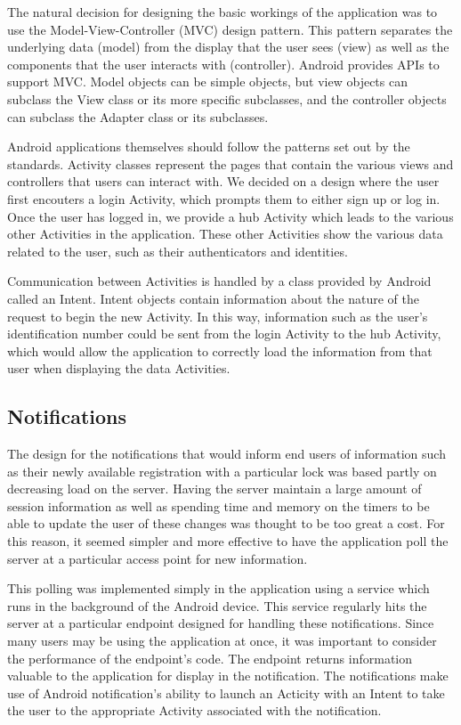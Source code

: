 \documentclass[12pt]{report}
\begin{document}
The natural decision for designing the basic workings of the application was to use the Model-View-Controller (MVC) 
design pattern. This pattern separates the underlying data (model) from the display that the user sees (view) as well as
the components that the user interacts with (controller). Android provides APIs to support MVC. Model objects can be
simple objects, but view objects can subclass the View class or its more specific subclasses, and the controller
objects can subclass the Adapter class or its subclasses.

Android applications themselves should follow the patterns set out by the standards. Activity classes represent the
pages that contain the various views and controllers that users can interact with. We decided on a design where the user
first encouters a login Activity, which prompts them to either sign up or log in. Once the user has logged in, we
provide a hub Activity which leads to the various other Activities in the application. These other Activities show the
various data related to the user, such as their authenticators and identities.

Communication between Activities is handled by a class provided by Android called an Intent. Intent objects contain
information about the nature of the request to begin the new Activity. In this way, information such as the user's
identification number could be sent from the login Activity to the hub Activity, which would allow the application to
correctly load the information from that user when displaying the data Activities.


\subsection{Notifications}

The design for the notifications that would inform end users of information such as their newly available registration
with a particular lock was based partly on decreasing load on the server. Having the server maintain a large amount of
session information as well as spending time and memory on the timers to be able to update the user of these changes
was thought to be too great a cost. For this reason, it seemed simpler and more effective to have the application poll
the server at a particular access point for new information.

This polling was implemented simply in the application using a service which runs in the background of the Android
device. This service regularly hits the server at a particular endpoint designed for handling these notifications. Since
many users may be using the application at once, it was important to consider the performance of the endpoint's code.
The endpoint returns information valuable to the application for display in the notification. The notifications make use
of Android notification's ability to launch an Acticity with an Intent to take the user to the appropriate Activity
associated with the notification.
\end{document}
